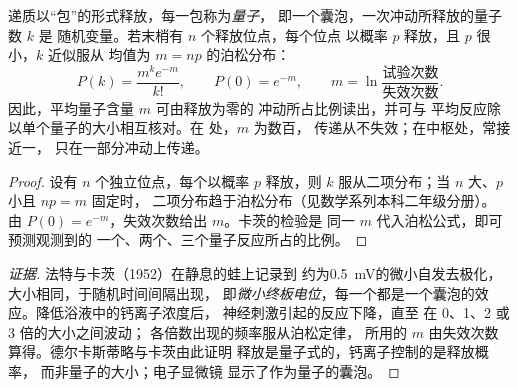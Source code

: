 \begin{theorem}[量子式释放]\label{thm:b2:neurons-synapses:quantal}
递质以“包”的形式释放，每一包称为\emph{量子}，
即一个囊泡，一次冲动所释放的量子数 $k$ 是
随机变量。若末梢有 $n$ 个释放位点，每个位点
以概率 $p$ 释放，且 $p$ 很小，$k$ 近似服从
均值为 $m = np$ 的泊松分布：
\[
P(k) = \frac{m^{k}e^{-m}}{k!}, \qquad P(0) = e^{-m}, \qquad
m = \ln\frac{\text{试验次数}}{\text{失效次数}}.
\]
因此，平均量子含量 $m$ 可由释放为零的
冲动所占比例读出，并可与
平均反应除以单个量子的大小相互核对。在
处，$m$ 为数百，
传递从不失效；在中枢处，常接近一，
只在一部分冲动上传递。
\end{theorem}
\begin{proof}
设有 $n$ 个独立位点，每个以概率 $p$ 释放，则 $k$
服从二项分布；当 $n$ 大、$p$ 小且 $np = m$ 固定时，
二项分布趋于泊松分布（见数学系列本科二年级分册）。
由 $P(0) = e^{-m}$，失效次数给出 $m$。卡茨的检验是
同一 $m$ 代入泊松公式，即可预测观测到的
一个、两个、三个量子反应所占的比例。
\end{proof}
\begin{proof}[证据]
法特与卡茨（1952）在静息的蛙上记录到
约为\qty{0.5}{mV}的微小自发去极化，
大小相同，于随机时间间隔出现，
即\emph{微小终板电位}，每一个都是一个囊泡的效应。降低浴液中的钙离子浓度后，
神经刺激引起的反应下降，直至
在 0、1、2 或 3 倍的大小之间波动；
各倍数出现的频率服从泊松定律，
所用的 $m$ 由失效次数算得。德尔卡斯蒂略与卡茨由此证明
释放是量子式的，钙离子控制的是释放概率，
而非量子的大小；电子显微镜
显示了作为量子的囊泡。
\end{proof}

